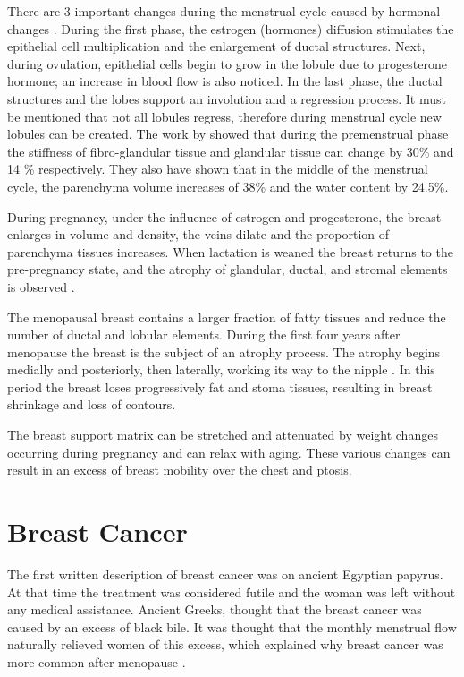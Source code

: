 There are 3 important changes during the menstrual cycle caused by hormonal changes \citep{andolina2011mammographic}. During the first phase, the estrogen (hormones) diffusion stimulates the epithelial cell multiplication and the enlargement of ductal structures. Next, during ovulation, epithelial cells begin to grow in the lobule due to progesterone hormone; an increase in blood flow is also noticed. In the last phase, the ductal structures and the lobes support an involution and a regression process. It must be mentioned that not all lobules regress, therefore during menstrual cycle new lobules can be created.   The work by \cite{lorenzen_menstrual-cycle_2003} showed that during the premenstrual phase the stiffness of fibro-glandular tissue and glandular tissue can change by 30\% and 14 \% respectively. They also have shown that in the middle of the menstrual cycle, the parenchyma volume increases of 38\% and the water content by 24.5\%.

During pregnancy, under the influence of estrogen and progesterone, the breast enlarges in volume and density, the veins dilate and the proportion of parenchyma tissues increases.  When lactation is weaned the breast returns to the pre-pregnancy state, and the atrophy of glandular, ductal, and stromal elements  is observed \citep{pandya_breast_2011}.

The menopausal breast contains a larger fraction of fatty tissues and reduce the number of ductal and lobular elements. During the first four years after menopause the breast is the subject of an atrophy process. The atrophy begins medially and posteriorly, then laterally, working its way to the nipple \citep{andolina2011mammographic}. In this period the breast loses progressively fat and stoma tissues, resulting in breast shrinkage and loss of contours.

 The breast support matrix can be stretched and attenuated by weight changes occurring during pregnancy and can relax with aging. These various changes can result in an excess of breast mobility over the chest and ptosis. 

\section{Breast Cancer}\label{section:breastcancer}

The first written description of breast cancer was on ancient Egyptian papyrus. At that time the treatment was considered futile and the woman was left without any medical assistance. Ancient Greeks, thought that the breast cancer was caused by an excess of black bile. It was thought that the monthly menstrual flow naturally relieved women of this excess, which explained why breast cancer was more common after menopause \citep{andolina2011mammographic}.

